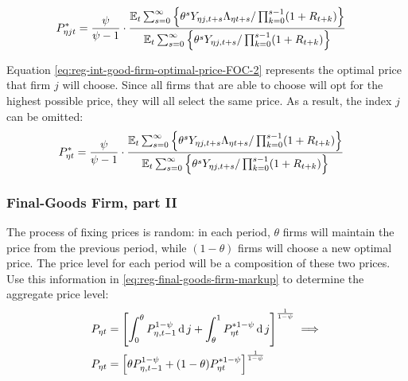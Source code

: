 \documentclass[
thesis.tex
]{subfiles}
\begin{document}
\vspace*{-1cm}

\begin{align}
	\label{eq:reg-int-good-firm-optimal-price-FOC-2}
	P_{\eta jt}^\ast &= 
	\frac{\psi}{\psi-1} \cdot
	\frac{
		{\mathbb{E}_{t}} \sum_{s=0}^{\infty} \left\{ 
		\theta^s Y_{\eta j,t+s} \Lambda_{\eta t+s} / \prod_{k=0}^{s-1}(1+R_{t+k}) \right\} } {{\mathbb{E}_{t}} \sum_{s=0}^{\infty} \left\{
		\theta^s Y_{\eta j,t+s} / \prod_{k=0}^{s-1}(1+R_{t+k}) \right\}}
\end{align}


Equation \ref{eq:reg-int-good-firm-optimal-price-FOC-2} represents the optimal price that firm $j$ will choose. Since all firms that are able to choose will opt for the highest possible price, they will all select the same price. As a result, the index $j$ can be omitted:
\begin{align}
	\label{eq:reg-int-good-firm-optimal-price-FOC-3}
	P_{\eta t}^\ast &= 
	\frac{\psi}{\psi-1} \cdot
	\frac{
		{\mathbb{E}_{t}} \sum_{s=0}^{\infty} \left\{ 
		\theta^s Y_{\eta j,t+s} \Lambda_{\eta t+s} / \prod_{k=0}^{s-1}(1+R_{t+k}) \right\} } {{\mathbb{E}_{t}} \sum_{s=0}^{\infty} \left\{
		\theta^s Y_{\eta j,t+s} / \prod_{k=0}^{s-1}(1+R_{t+k}) \right\}}
\end{align}


\subsubsection*{Final-Goods Firm, part II}

The process of fixing prices is random: in each period, $\theta$ firms will maintain the price from the previous period, while $(1-\theta)$ firms will choose a new optimal price. The price level for each period will be a composition of these two prices. Use this information in \ref{eq:reg-final-goods-firm-markup} to determine the aggregate price level:
\begin{align}
	P_{\eta t} & = \left[ \int_{0}^{\theta} P_{\eta, t-1}^{1-\psi} \operatorname{d} j + \int_{\theta}^{1} P_{\eta t}^{\ast 1-\psi} \operatorname{d} j \right]^{\frac{1}{1-\psi}}  \implies \nonumber \\
	P_{\eta t} & = \left[ \theta P_{\eta, t-1}^{1-\psi} + (1-\theta) P_{\eta t}^{\ast 1-\psi} \right]^\frac{1}{1-\psi} \label{eq:reg-general-price-level}
\end{align}
\end{document}
